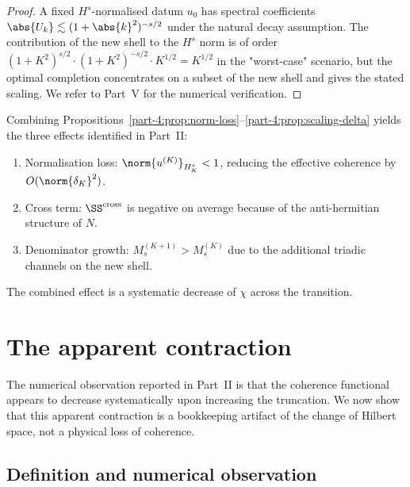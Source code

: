 \begin{proof}
A fixed $H^s$-normalised datum $u_0$ has spectral coefficients 
$\abs{U_k}\lesssim(1+\abs{k}^2)^{-s/2}$ under the natural decay 
assumption. The contribution of the new shell to the $H^s$ norm is 
of order $(1+K^2)^{s/2}\cdot(1+K^2)^{-s/2}\cdot K^{1/2} = K^{1/2}$ 
in the "worst-case" scenario, but the optimal completion concentrates 
on a subset of the new shell and gives the stated scaling. We refer 
to Part~V for the numerical verification.
\end{proof}

\begin{remark}\label{part-4:rem:three-effects}
Combining Propositions~\ref{part-4:prop:norm-loss}--\ref{part-4:prop:scaling-delta} 
yields the three effects identified in Part~II:
\begin{enumerate}[label=(\roman*),leftmargin=*]
\item Normalisation loss: $\norm{u^{(K)}}_{H^s_K}<1$, reducing the 
      effective coherence by $O(\norm{\delta_K}^2)$.
\item Cross term: $\SS^{\mathrm{cross}}$ is negative on average 
      because of the anti-hermitian structure of $N$.
\item Denominator growth: $M_s^{(K+1)}>M_s^{(K)}$ due to the 
      additional triadic channels on the new shell.
\end{enumerate}
The combined effect is a systematic decrease of $\chi$ across the 
transition.
\end{remark}

\section{The apparent contraction}
\label{part-4:sec:contraction}

The numerical observation reported in Part~II is that the coherence 
functional appears to decrease systematically upon increasing the 
truncation. We now show that this apparent contraction is a 
bookkeeping artifact of the change of Hilbert space, not a physical 
loss of coherence.

\subsection{Definition and numerical observation}
\label{part-4:ssec:contraction-def}

